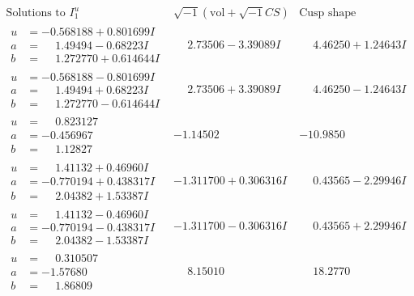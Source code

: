 \documentclass[1p]{elsarticle_modified}
\theoremstyle{definition}
\newcommand{\I}{\sqrt{-1}}
\begin{document}
$$\begin{array}{c|c|c}  
\text{Solutions to }I^u_{1}& \I (\text{vol} + \sqrt{-1}CS) & \text{Cusp shape}\\
 \hline 
\begin{aligned}
u &= -0.568188 + 0.801699 I \\
a &= \phantom{-}1.49494 - 0.68223 I \\
b &= \phantom{-}1.272770 + 0.614644 I\end{aligned}
 & \phantom{-}2.73506 - 3.39089 I & \phantom{-}4.46250 + 1.24643 I \\ \hline\begin{aligned}
u &= -0.568188 - 0.801699 I \\
a &= \phantom{-}1.49494 + 0.68223 I \\
b &= \phantom{-}1.272770 - 0.614644 I\end{aligned}
 & \phantom{-}2.73506 + 3.39089 I & \phantom{-}4.46250 - 1.24643 I \\ \hline\begin{aligned}
u &= \phantom{-}0.823127\phantom{ +0.000000I} \\
a &= -0.456967\phantom{ +0.000000I} \\
b &= \phantom{-}1.12827\phantom{ +0.000000I}\end{aligned}
 & -1.14502\phantom{ +0.000000I} & -10.9850\phantom{ +0.000000I} \\ \hline\begin{aligned}
u &= \phantom{-}1.41132 + 0.46960 I \\
a &= -0.770194 + 0.438317 I \\
b &= \phantom{-}2.04382 + 1.53387 I\end{aligned}
 & -1.311700 + 0.306316 I & \phantom{-}0.43565 - 2.29946 I \\ \hline\begin{aligned}
u &= \phantom{-}1.41132 - 0.46960 I \\
a &= -0.770194 - 0.438317 I \\
b &= \phantom{-}2.04382 - 1.53387 I\end{aligned}
 & -1.311700 - 0.306316 I & \phantom{-}0.43565 + 2.29946 I \\ \hline\begin{aligned}
u &= \phantom{-}0.310507\phantom{ +0.000000I} \\
a &= -1.57680\phantom{ +0.000000I} \\
b &= \phantom{-}1.86809\phantom{ +0.000000I}\end{aligned}
 & \phantom{-}8.15010\phantom{ +0.000000I} & \phantom{-}18.2770\phantom{ +0.000000I} \\ \hline\begin{aligned}

\end{aligned}
\end{array}$$
\end{document}
